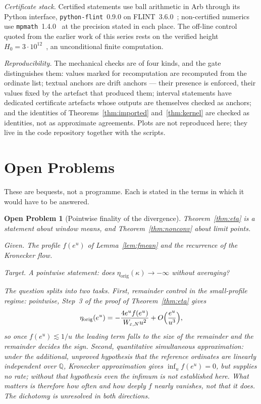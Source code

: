 \documentclass[11pt]{article}
\newtheorem{openproblem}[theorem]{Open Problem}
\newcommand{\WeN}{W_{\varepsilon,N}}
\begin{document}
\emph{Certificate stack.} Certified statements use ball arithmetic in Arb
through its Python interface, \texttt{python-flint}~0.9.0 on
FLINT~3.6.0~\cite{Johansson17}; non-certified numerics use
\texttt{mpmath}~1.4.0~\cite{mpmath} at the precision stated in each place. The
off-line control quoted from the earlier work of this series rests on the
verified height $H_0=3\cdot10^{12}$~\cite{PlattTrudgian21}, an unconditional
finite computation.

\emph{Reproducibility.} The mechanical checks are of four kinds, and the
gate distinguishes them: values marked for recomputation are recomputed from
the ordinate list; textual anchors are drift anchors --- their presence is
enforced, their values fixed by the artefact that produced them; interval
statements have dedicated certificate artefacts whose outputs are themselves
checked as anchors; and the identities of Theorems~\ref{thm:imported}
and~\ref{thm:kernel} are checked as identities, not as approximate
agreements. Plots are not reproduced here; they live in the
code repository together with the scripts.

\section{Open Problems}
\label{sec:open}

These are bequests, not a programme. Each is stated in the terms in which it
would have to be answered.

\begin{openproblem}[Pointwise finality of the divergence]
\label{op:pointwise}
Theorem~\ref{thm:eta} is a statement about window means, and
Theorem~\ref{thm:nonconv} about limit points.

\smallskip
\noindent\emph{Given.} The profile $f(e^u)$ of Lemma~\ref{lem:fmean} and the
recurrence of the Kronecker flow.

\smallskip
\noindent\emph{Target.} A pointwise statement: does
$\eta_{\mathrm{orig}}(\kappa)\to-\infty$ without averaging?

\smallskip
\noindent The question splits into two tasks. First, remainder control in
the small-profile regime: pointwise, Step~3 of the proof of
Theorem~\ref{thm:eta} gives
\[
\eta_{\mathrm{orig}}(e^u)=-\frac{4e^uf(e^u)}{\WeN u^2}+O\Bigl(\frac{e^u}{u^3}\Bigr),
\]
so once
$f(e^u)\lesssim1/u$ the leading term falls to the size of the remainder and
the remainder decides the sign. Second, quantitative
simultaneous approximation: under the additional, unproved hypothesis that
the reference ordinates are linearly independent over $\mathbb{Q}$,
Kronecker approximation gives $\inf_u f(e^u)=0$, but supplies no rate;
without that hypothesis even the infimum is not established here. What
matters is therefore how often and how deeply $f$ nearly vanishes, not that
it does. The dichotomy is unresolved in both
directions.
\end{openproblem}
\end{document}
